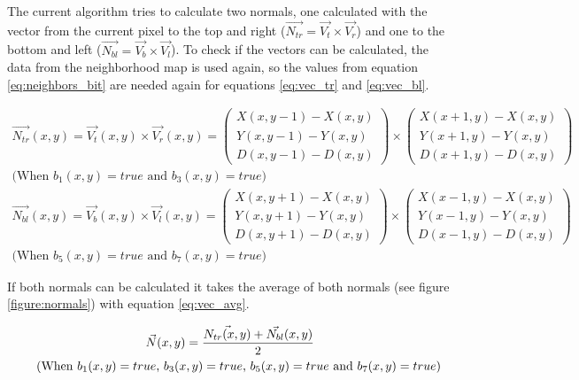 The current algorithm tries to calculate two normals, one calculated with the vector from the current pixel to the top and right 
($\vec{N_{tr}}=\vec{V_t}\times\vec{V_r}$) and one to the bottom and left ($\vec{N_{bl}}=\vec{V_b}\times\vec{V_l}$). To check
if the vectors can be calculated, the data from the neighborhood map is used again, so the values from equation 
\vref{eq:neighbors_bit} are needed again for equations \vref{eq:vec_tr} and \vref{eq:vec_bl}. 


\begin{gather}
 \vec{N_{tr}}(x,y)=    \vec{V_t}(x,y) \times \vec{V_r}(x,y) =
                  \left( \begin{array}{c}   X(x,y-1) -  X(x,y)  \\ Y(x,y-1) -  Y(x,y) \\ D(x,y-1) -  D(x,y)\end{array} \right) 
           \times \left( \begin{array}{c}   X(x+1,y) -  X(x,y)  \\ Y(x+1,y) -  Y(x,y) \\ D(x+1,y) -  D(x,y)\end{array} \right)\nonumber
			\\\mbox{(When $b_1(x,y)=true$ and $b_3(x,y)=true$)}
\label{eq:vec_tr}\\
 \vec{N_{bl}}(x,y)=    \vec{V_b}(x,y) \times \vec{V_l}(x,y) =
                  \left( \begin{array}{c}   X(x,y+1) -  X(x,y)  \\ Y(x,y+1) -  Y(x,y) \\ D(x,y+1) -  D(x,y)\end{array} \right) 
           \times \left( \begin{array}{c}   X(x-1,y) -  X(x,y)  \\ Y(x-1,y) -  Y(x,y) \\ D(x-1,y) -  D(x,y)\end{array} \right)\nonumber
			\\\mbox{(When $b_5(x,y)=true$ and $b_7(x,y)=true$)}
\label{eq:vec_bl}
\end{gather}

If both normals can be calculated it takes the average of both normals (see figure \vref{figure:normals}) with equation 
\vref{eq:vec_avg}.

\begin{gather}
	\vec{N}(x,y) = \frac{\vec{N_{tr}(x,y)} + \vec{N_{bl}}(x,y)}{2}\nonumber\\
\mbox{\hspace{0.5cm}(When $b_1(x,y)=true$, $b_3(x,y)=true$, $b_5(x,y)=true$ and $b_7(x,y)=true$)}
\label{eq:vec_avg} 
\end{gather} 



